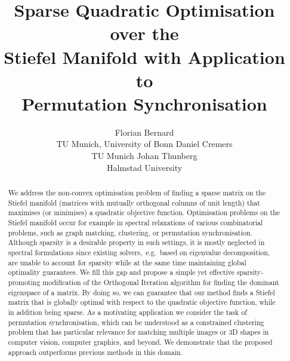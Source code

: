 \documentclass{article}
\title{
Sparse Quadratic Optimisation over the\\ Stiefel Manifold with Application to\\ Permutation Synchronisation
}
\author{%
  Florian Bernard\\
  TU Munich, University of Bonn
  \And
  Daniel Cremers\\TU Munich
  \And 
  Johan Thunberg\\
  Halmstad University
}
\begin{document}
\maketitle

\begin{abstract}
We address the non-convex optimisation problem of finding a sparse matrix on the Stiefel manifold (matrices with mutually orthogonal columns of unit length) that maximises (or minimises) a quadratic objective function. Optimisation problems on the Stiefel manifold occur for example in spectral relaxations of various combinatorial problems, such as graph matching, clustering, or permutation synchronisation. Although sparsity is a desirable property in such settings, it is mostly neglected in spectral formulations since existing solvers,~e.g.~based on eigenvalue decomposition, are unable to account for sparsity while at the same time maintaining global optimality guarantees. We fill this gap and propose a simple yet effective sparsity-promoting modification of the Orthogonal Iteration algorithm for finding the dominant eigenspace of a matrix. By doing so, we can guarantee that our method finds a Stiefel matrix that is globally optimal with respect to the quadratic objective function, while in addition being sparse. As a motivating application we consider the task of permutation synchronisation, which can be understood as a constrained clustering problem that has particular relevance for matching multiple images or 3D shapes in computer vision, computer graphics, and beyond. We demonstrate that the proposed approach outperforms previous methods in this domain.
\end{abstract}
\end{document}
